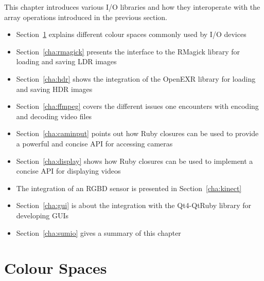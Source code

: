 \documentclass[12pt,a4paper,oneside,openright]{book}
\newcommand{\sct}[1]{Section~\ref{cha:#1}}
\begin{document}
\begin{CJK}{UTF8}{}
This chapter introduces various \ac{I}/\ac{O} libraries and how they interoperate with the array operations introduced in the previous section.
\begin{itemize}
\item \sct{csp} explains different colour spaces commonly used by \ac{I}/\ac{O} devices
\item \sct{rmagick} presents the interface to the RMagick library for loading and saving \ac{LDR} images
\item \sct{hdr} shows the integration of the OpenEXR library for loading and saving \ac{HDR} images
\item \sct{ffmpeg} covers the different issues one encounters with encoding and decoding video files
\item \sct{caminput} points out how Ruby closures can be used to provide a powerful and concise \ac{API} for accessing cameras
\item \sct{display} shows how Ruby closures can be used to implement a concise \ac{API} for displaying videos
\item The integration of an \ac{RGBD} sensor is presented in \sct{kinect} 
\item \sct{gui} is about the integration with the Qt4-QtRuby library for developing \acp{GUI}
\item \sct{sumio} gives a summary of this chapter
\end{itemize}

\section{Colour Spaces}\label{cha:csp}

\end{CJK}
\end{document}
